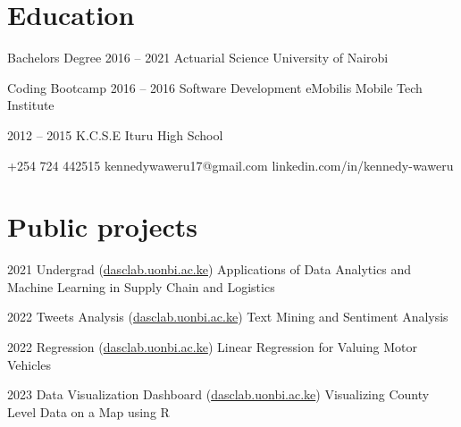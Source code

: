 \documentclass[fontsize=9pt]{tccv}
\begin{document}
\section{Education}

\begin{yearlist}

\item[Bachelors Degree]{2016 -- 2021}
     {Actuarial Science}
     {University of Nairobi}

\item[Coding Bootcamp]{2016 -- 2016}
     {Software Development}
     {eMobilis Mobile Tech Institute}
     
\item{2012 -- 2015}
     {K.C.S.E}
     {Ituru High School}

\end{yearlist}


    {+254 724 442515}
    {kennedywaweru17@gmail.com}
    {linkedin.com/in/kennedy-waweru}


\section{Public projects}

\begin{yearlist}

\item{2021}
     {Undergrad (\href{https://dasclab.uonbi.ac.ke/analytics/storage/Notes/machine-learning/d3x7xSZjFitEPZxnF5Y9Yweu9vq5RFR61Lc9xPpt.pdf}{dasclab.uonbi.ac.ke})}
     {Applications of Data Analytics and Machine Learning in Supply Chain and Logistics}

\item{2022}
     {Tweets Analysis (\href{https://dasclab.uonbi.ac.ke/dstraining/text-mining-and-wordclouds.html}{dasclab.uonbi.ac.ke})}
     {Text Mining and Sentiment Analysis}

\item{2022}
     {Regression (\href{https://dasclab.uonbi.ac.ke/dstraining/linear-regression-machine-learning-R.html}{dasclab.uonbi.ac.ke})}
     {Linear Regression for Valuing Motor Vehicles}


\item{2023}
     {Data Visualization Dashboard (\href{https://dasclab.uonbi.ac.ke/analytics/blog/visualizing-map-data-with-ggplot-and-leaflet}{dasclab.uonbi.ac.ke})}
     {Visualizing County Level Data on a Map using R}


\end{yearlist}
\end{document}
